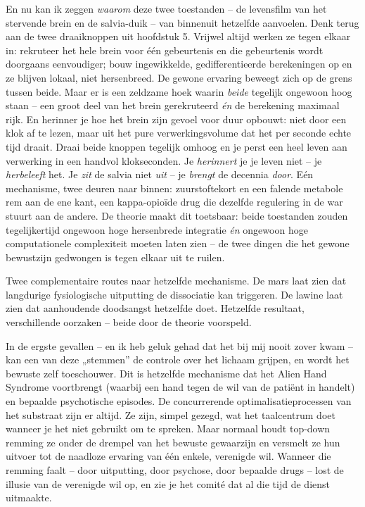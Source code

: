 \documentclass[11pt, twoside, openright]{book}
\begin{document}
En nu kan ik zeggen \textit{waarom} deze twee toestanden -- de levensfilm van het stervende brein en de salvia-duik -- van binnenuit hetzelfde aanvoelen. Denk terug aan de twee draaiknoppen uit hoofdstuk 5. Vrijwel altijd werken ze tegen elkaar in: rekruteer het hele brein voor één gebeurtenis en die gebeurtenis wordt doorgaans eenvoudiger; bouw ingewikkelde, gedifferentieerde berekeningen op en ze blijven lokaal, niet hersenbreed. De gewone ervaring beweegt zich op de grens tussen beide. Maar er is een zeldzame hoek waarin \textit{beide} tegelijk ongewoon hoog staan -- een groot deel van het brein gerekruteerd \textit{én} de berekening maximaal rijk. En herinner je hoe het brein zijn gevoel voor duur opbouwt: niet door een klok af te lezen, maar uit het pure verwerkingsvolume dat het per seconde echte tijd draait. Draai beide knoppen tegelijk omhoog en je perst een heel leven aan verwerking in een handvol klokseconden. Je \textit{herinnert} je je leven niet -- je \textit{herbeleeft} het. Je \textit{zit} de salvia niet \textit{uit} -- je \textit{brengt} de decennia \textit{door}. Eén mechanisme, twee deuren naar binnen: zuurstoftekort en een falende metabole rem aan de ene kant, een kappa-opioïde drug die dezelfde regulering in de war stuurt aan de andere. De theorie maakt dit toetsbaar: beide toestanden zouden tegelijkertijd ongewoon hoge hersenbrede integratie \textit{én} ongewoon hoge computationele complexiteit moeten laten zien -- de twee dingen die het gewone bewustzijn gedwongen is tegen elkaar uit te ruilen.

Twee complementaire routes naar hetzelfde mechanisme. De mars laat zien dat langdurige fysiologische uitputting de dissociatie kan triggeren. De lawine laat zien dat aanhoudende doodsangst hetzelfde doet. Hetzelfde resultaat, verschillende oorzaken -- beide door de theorie voorspeld.

In de ergste gevallen -- en ik heb geluk gehad dat het bij mij nooit zover kwam -- kan een van deze „stemmen” de controle over het lichaam grijpen, en wordt het bewuste zelf toeschouwer. Dit is hetzelfde mechanisme dat het Alien Hand Syndrome voortbrengt (waarbij een hand tegen de wil van de patiënt in handelt) en bepaalde psychotische episodes. De concurrerende optimalisatieprocessen van het substraat zijn er altijd. Ze zijn, simpel gezegd, wat het taalcentrum doet wanneer je het niet gebruikt om te spreken. Maar normaal houdt top-down remming ze onder de drempel van het bewuste gewaarzijn en versmelt ze hun uitvoer tot de naadloze ervaring van één enkele, verenigde wil. Wanneer die remming faalt -- door uitputting, door psychose, door bepaalde drugs -- lost de illusie van de verenigde wil op, en zie je het comité dat al die tijd de dienst uitmaakte.
\end{document}
